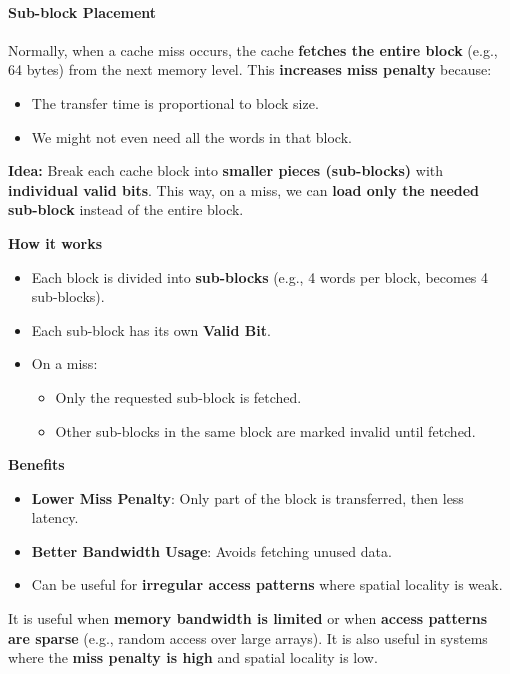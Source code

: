 \paragraph{Sub-block Placement}

Normally, when a cache miss occurs, the cache \textbf{fetches the entire block} (e.g., 64 bytes) from the next memory level. This \textbf{increases miss penalty} because:
\begin{itemize}
    \item The transfer time is proportional to block size.
    \item We might not even need all the words in that block.
\end{itemize}
\textbf{Idea:} Break each cache block into \textbf{smaller pieces (sub-blocks)} with \textbf{individual valid bits}. This way, on a miss, we can \textbf{load only the needed sub-block} instead of the entire block.


\highspace
\begin{flushleft}
    \textcolor{Green3}{ \textbf{How it works}}
\end{flushleft}
\begin{itemize}
    \item Each block is divided into \textbf{sub-blocks} (e.g., 4 words per block, becomes 4 sub-blocks).
    \item Each sub-block has its own \textbf{Valid Bit}.
    \item On a miss:
    \begin{itemize}
        \item Only the requested sub-block is fetched.
        \item Other sub-blocks in the same block are marked invalid until fetched.
    \end{itemize}
\end{itemize}

\highspace
\begin{flushleft}
    \textcolor{Green3}{ \textbf{Benefits}}
\end{flushleft}
\begin{itemize}
    \item[\textcolor{Green3}{\faIcon{check}}] \textbf{Lower Miss Penalty}: Only part of the block is transferred, then less latency.
    \item[\textcolor{Green3}{\faIcon{check}}] \textbf{Better Bandwidth Usage}: Avoids fetching unused data.
    \item[\textcolor{Green3}{\faIcon{check}}] Can be useful for \textbf{irregular access patterns} where spatial locality is weak.
\end{itemize}
It is useful when \textbf{memory bandwidth is limited} or when \textbf{access patterns are sparse} (e.g., random access over large arrays). It is also useful in systems where the \textbf{miss penalty is high} and spatial locality is low.

